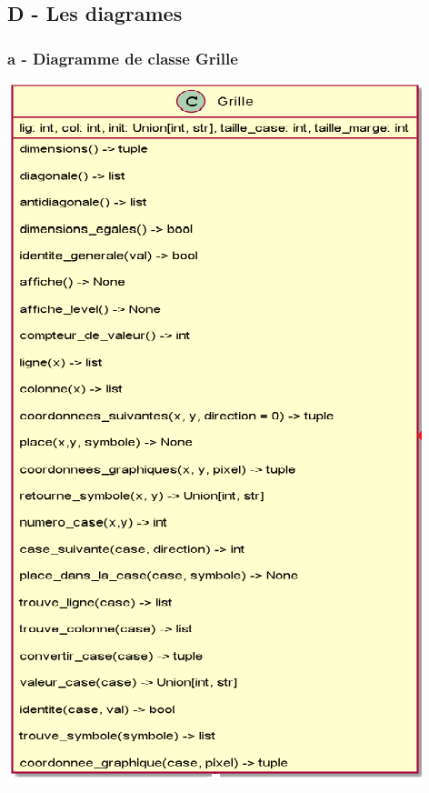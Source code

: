 \documentclass[a4paper,12pt]{article} %
\begin{document}
\subsection*{D - Les diagrames}
\subsubsection*{a - Diagramme de classe Grille}
\label{Grille}
\begin{center}
	\includegraphics[scale=0.5]{images/classe_grille.png}
\end{center}
\end{document}
